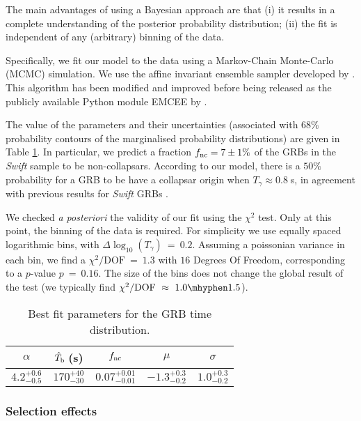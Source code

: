 \documentclass[useAMS,usenatbib]{mn2e}
\begin{document}
The main advantages of using a Bayesian approach are that (i) it results in a complete understanding of the posterior probability distribution; (ii) the fit is independent of any (arbitrary) binning of the data.

Specifically, we fit our model to the data using a Markov-Chain Monte-Carlo (MCMC) simulation. We use the affine invariant ensemble sampler developed by
\citet{GoodmanWeare2010}. This algorithm has been modified and improved before being released as the publicly available Python module {\small EMCEE} by \citet{emcee2013}.

The value of the parameters and their uncertainties (associated with $68\%$ probability contours of the marginalised probability distributions) are given in Table \ref{table:fit}. In particular, we predict a fraction $f_{\rm nc}= 7\pm1\%$ of the GRBs in the {\it Swift} sample to be non-collapsars. According to our model, there is a $50\%$ probability for a GRB to be have a collapsar origin when $T_\gamma\approx 0.8\;$s, in agreement with previous results for {\it Swift} GRBs \citep{Bromberg2013}.

We checked {\it a posteriori} the validity of our fit using the $\chi^2$ test. Only at this point, the binning of the data is required. For simplicity we use equally spaced logarithmic bins, with $\Delta\log_{10}\left(T_\gamma\right)~=~0.2$. Assuming a poissonian variance in each bin, we find a $\chi^2/\text{DOF}~=~1.3$ with $16$ Degrees Of Freedom, corresponding to a $p$-value $p~=~0.16$. The size of the bins does not change the global result of the test (we typically find $\chi^2/\text{DOF}~\approx~1.0\mhyphen1.5$).

\begin{table}
\caption{Best fit parameters for the GRB time distribution.}
\begin{tabular} {c c c c c}
\toprule
$\alpha$ & $\hat{T}_{\rm b}\;$(s) & $f_{\rm nc}$ & $\mu$ & $\sigma$ \\
\midrule
$4.2_{-0.5}^{+0.6}$ & $170_{-30}^{+40}$ & $0.07_{-0.01}^{+0.01}$ & $-1.3_{-0.2}^{+0.3}$ & $1.0_{-0.2}^{+0.3}$\\
\bottomrule
\end{tabular}
\label{table:fit}
\end{table}


\subsubsection*{Selection effects}
\end{document}
